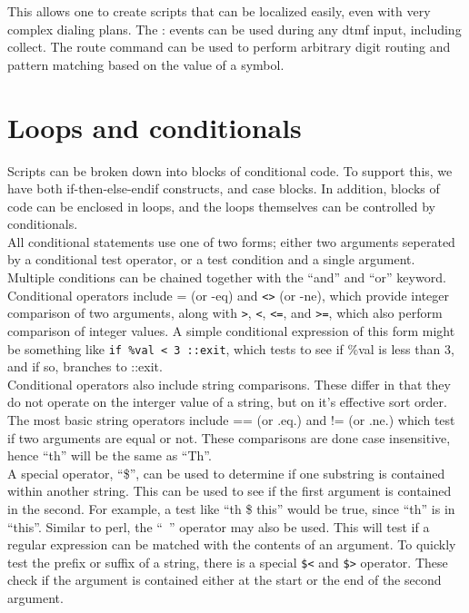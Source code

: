 \documentclass[a4paper,12pt]{article}
\begin{document}
This allows one to create scripts that can be localized easily, even
with very complex dialing plans.  The \@digits: events can be used
during any dtmf input, including collect.  The route command can be
used to perform arbitrary digit routing and pattern matching based on the
value of a symbol. \\

\section{Loops and conditionals}

Scripts can be broken down into blocks of conditional code.  To support 
this, we have both if-then-else-endif constructs, and case blocks.  In 
addition, blocks of code can be enclosed in loops, and the loops
themselves can be controlled by conditionals. \\

All conditional statements use one of two forms; either two arguments 
seperated by a conditional test operator, or a test condition and a single 
argument.  Multiple conditions can be chained together with the ``and'' 
and ``or'' keyword. \\

Conditional operators include = (or -eq) and \verb|<>| (or -ne), which
provide integer comparison of two arguments, along with \verb|>|,
\verb|<|, \verb|<=|, and \verb|>=|, which also perform comparison of
integer values.  A simple conditional expression of this form might be
something like \verb|if %val < 3 ::exit|, which tests to see if \%val is
less than 3, and if so, branches to ::exit. \\

Conditional operators also include string comparisons.  These differ in
that they do not operate on the interger value of a string, but on it's
effective sort order.  The most basic string operators include == (or
.eq.) and != (or .ne.) which test if two arguments are equal or not.  
These comparisons are done case insensitive, hence ``th'' will be the same 
as ``Th''. \\

A special operator, ``\$'', can be used to determine if one substring is
contained within another string.  This can be used to see if the first
argument is contained in the second.  For example, a test like ``th \$
this'' would be true, since ``th'' is in ``this''.  Similar to perl, the
``~'' operator may also be used.  This will test if a regular expression
can be matched with the contents of an argument.  To quickly test the
prefix or suffix of a string, there is a special \verb|$<| and \verb|$>|
operator.  These check if the argument is contained either at the start or
the end of the second argument. \\
\end{document}
